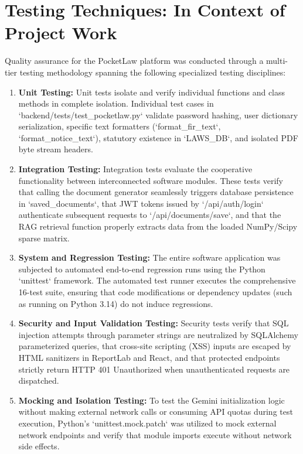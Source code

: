 \section{Testing Techniques: In Context of Project Work}
\label{sec:testing_techniques}

Quality assurance for the PocketLaw platform was conducted through a multi-tier testing methodology spanning the following specialized testing disciplines:

\begin{enumerate}
    \item \textbf{Unit Testing:}
    Unit tests isolate and verify individual functions and class methods in complete isolation. Individual test cases in `backend/tests/test_pocketlaw.py` validate password hashing, user dictionary serialization, specific text formatters (`format_fir_text`, `format_notice_text`), statutory existence in `LAWS_DB`, and isolated PDF byte stream headers.
    
    \item \textbf{Integration Testing:}
    Integration tests evaluate the cooperative functionality between interconnected software modules. These tests verify that calling the document generator seamlessly triggers database persistence in `saved_documents`, that JWT tokens issued by `/api/auth/login` authenticate subsequent requests to `/api/documents/save`, and that the RAG retrieval function properly extracts data from the loaded NumPy/Scipy sparse matrix.
    
    \item \textbf{System and Regression Testing:}
    The entire software application was subjected to automated end-to-end regression runs using the Python `unittest` framework. The automated test runner executes the comprehensive 16-test suite, ensuring that code modifications or dependency updates (such as running on Python 3.14) do not induce regressions.
    
    \item \textbf{Security and Input Validation Testing:}
    Security tests verify that SQL injection attempts through parameter strings are neutralized by SQLAlchemy parameterized queries, that cross-site scripting (XSS) inputs are escaped by HTML sanitizers in ReportLab and React, and that protected endpoints strictly return HTTP 401 Unauthorized when unauthenticated requests are dispatched.
    
    \item \textbf{Mocking and Isolation Testing:}
    To test the Gemini initialization logic without making external network calls or consuming API quotas during test execution, Python's `unittest.mock.patch` was utilized to mock external network endpoints and verify that module imports execute without network side effects.
\end{enumerate}

